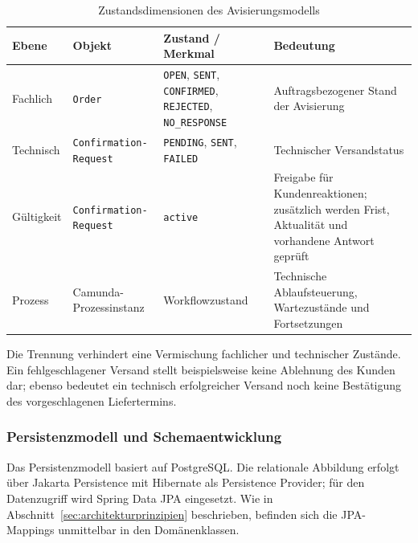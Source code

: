\documentclass[
  12pt,
  a4paper,
  oneside
]{article}
\begin{document}
\begin{table}[htbp]
  \centering
  \caption{Zustandsdimensionen des Avisierungsmodells}
  \label{tab:zustandsdimensionen}
  \small
  \setlength{\tabcolsep}{4pt}
  \begin{tabularx}{\textwidth}{@{}>{\raggedright\arraybackslash}p{}>{\raggedright\arraybackslash}p{}>{\raggedright\arraybackslash}p{}>{\raggedright\arraybackslash}X@{}}
    \toprule
    Ebene & Objekt & Zustand / Merkmal & Bedeutung \\
    \midrule
    Fachlich & \texttt{Order}
      & \texttt{OPEN}, \texttt{SENT}, \texttt{CONFIRMED}, \texttt{REJECTED}, \texttt{NO\_RESPONSE}
      & Auftragsbezogener Stand der Avisierung \\
    Technisch & \texttt{Confirmation-}\newline\texttt{Request}
      & \texttt{PENDING}, \texttt{SENT}, \texttt{FAILED}
      & Technischer Versandstatus \\
    Gültigkeit & \texttt{Confirmation-}\newline\texttt{Request}
      & \texttt{active}
      & Freigabe für Kundenreaktionen; zusätzlich werden Frist, Aktualität und vorhandene Antwort geprüft \\
    Prozess & Camunda-Prozessinstanz
      & Workflowzustand
      & Technische Ablaufsteuerung, Wartezustände und Fortsetzungen \\
    \bottomrule
  \end{tabularx}
\end{table}

Die Trennung verhindert eine Vermischung fachlicher und technischer Zustände.
Ein fehlgeschlagener Versand stellt beispielsweise keine Ablehnung des Kunden
dar; ebenso bedeutet ein technisch erfolgreicher Versand noch keine
Bestätigung des vorgeschlagenen Liefertermins.

\subsubsection{Persistenzmodell und Schemaentwicklung}
\label{sec:persistenzmodell}

Das Persistenzmodell basiert auf PostgreSQL. Die relationale Abbildung erfolgt
über Jakarta Persistence mit Hibernate als Persistence Provider; für den
Datenzugriff wird Spring Data JPA eingesetzt. Wie in
Abschnitt~\ref{sec:architekturprinzipien} beschrieben, befinden sich die
JPA-Mappings unmittelbar in den Domänenklassen.
\end{document}
